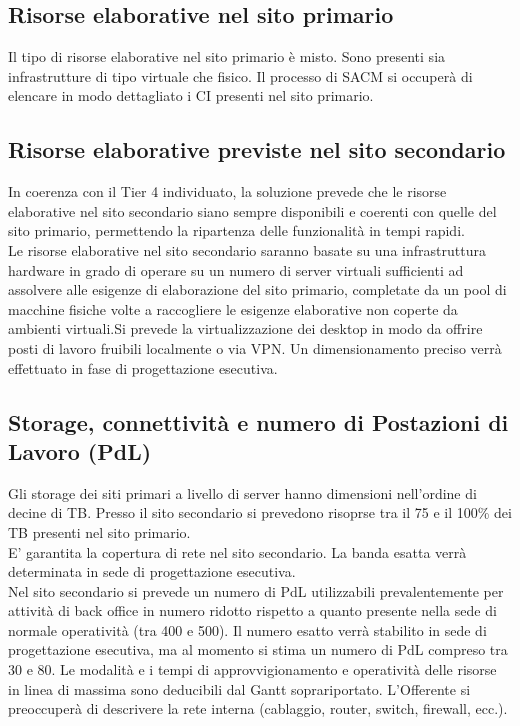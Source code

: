 \subsection{Risorse elaborative nel sito primario}
Il tipo di risorse elaborative nel sito primario è misto. 
Sono presenti sia infrastrutture di tipo virtuale che fisico. Il processo di SACM si occuperà di elencare in modo dettagliato i CI presenti nel sito primario.

\subsection{Risorse elaborative previste nel sito secondario}
In coerenza con il Tier 4 individuato, la soluzione prevede che le risorse elaborative nel sito secondario siano sempre disponibili e coerenti con quelle del sito primario, permettendo la ripartenza delle funzionalità in tempi rapidi.\\ 
Le risorse elaborative nel sito secondario saranno basate su una 
infrastruttura hardware in grado di operare su un 
numero di server virtuali sufficienti ad assolvere alle
esigenze di elaborazione del sito primario, completate
da un pool di macchine fisiche volte a raccogliere le
esigenze elaborative non coperte da ambienti virtuali.Si prevede 
la virtualizzazione dei desktop in modo da offrire posti 
di lavoro fruibili localmente o via VPN.
Un dimensionamento preciso verrà effettuato in fase di progettazione esecutiva.


\subsection{Storage, connettività e numero di Postazioni di Lavoro (PdL)}
Gli storage dei siti primari a livello di server hanno dimensioni nell'ordine di decine di TB. Presso il sito secondario si prevedono risoprse tra il 75 e il 100\% dei TB presenti nel sito primario.
\\ E' garantita la copertura di rete nel sito secondario. La banda esatta verrà determinata in sede di progettazione esecutiva.
\\ Nel sito secondario si prevede un numero di PdL utilizzabili 
prevalentemente per attività di back office in numero ridotto 
rispetto a quanto presente nella sede di normale operatività (tra 400 e 500). Il numero esatto verrà stabilito in sede di progettazione esecutiva, ma al momento si stima un numero di PdL compreso tra 30 e 80. Le modalità e i tempi di approvvigionamento e operatività delle risorse in linea di massima sono deducibili dal Gantt soprariportato.
L'Offerente si preoccuperà di descrivere la rete interna (cablaggio, router, switch, firewall, ecc.).

